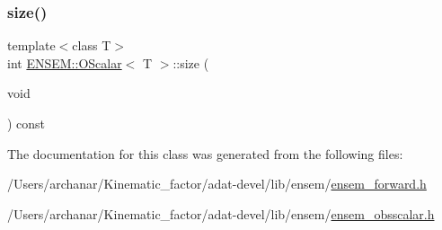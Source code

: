 \mbox{\label{classENSEM_1_1OScalar_a2029adc2feeab03e85a091ab6878fc2d}} 
\subsubsection{\texorpdfstring{size()}{size()}\hspace{0.1cm}{\footnotesize\ttfamily [3/3]}}
{\footnotesize\ttfamily template$<$class T$>$ \\
int \mbox{\hyperlink{classENSEM_1_1OScalar}{E\+N\+S\+E\+M\+::\+O\+Scalar}}$<$ T $>$\+::size (\begin{DoxyParamCaption}\item[{void}]{ }\end{DoxyParamCaption}) const\hspace{0.3cm}{\ttfamily [inline]}}



The documentation for this class was generated from the following files\+:\begin{DoxyCompactItemize}
\item 
/\+Users/archanar/\+Kinematic\+\_\+factor/adat-\/devel/lib/ensem/\mbox{\hyperlink{adat-devel_2lib_2ensem_2ensem__forward_8h}{ensem\+\_\+forward.\+h}}\item 
/\+Users/archanar/\+Kinematic\+\_\+factor/adat-\/devel/lib/ensem/\mbox{\hyperlink{adat-devel_2lib_2ensem_2ensem__obsscalar_8h}{ensem\+\_\+obsscalar.\+h}}\end{DoxyCompactItemize}
